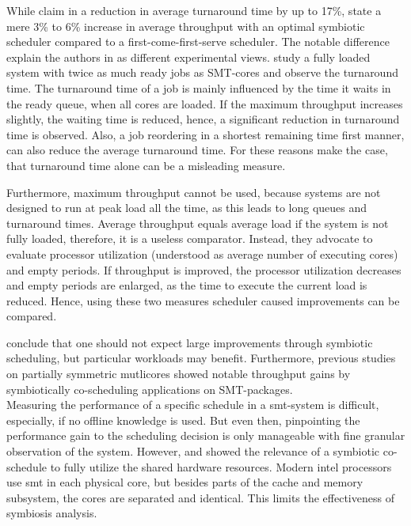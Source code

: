 While \citeauthor{snavely_symbiotic_2000} claim in
\cite{snavely_symbiotic_2000} a reduction in average turnaround time by up to
17\%, \citeauthor{eyerman_revisiting_2015} state a mere 3\% to 6\% increase in
average throughput with an optimal symbiotic scheduler compared to a
first-come-first-serve scheduler.
The notable difference explain the authors in \cite{eyerman_revisiting_2015} as
different experimental views. \citeauthor{snavely_symbiotic_2000} study a fully
loaded system with twice as much ready jobs as SMT-cores and observe the
turnaround time.
The turnaround time of a job is mainly influenced by the time it waits in the
ready queue, when all cores are loaded.
If the maximum throughput increases slightly, the waiting time is reduced,
hence, a significant reduction in turnaround time is observed.
Also, a job reordering in a shortest remaining time first manner, can also
reduce the average turnaround time.
For these reasons \citeauthor{eyerman_revisiting_2015} make the case,
that turnaround time alone can be a misleading measure.

Furthermore, maximum throughput cannot be used, because systems are not
designed to run at peak load all the time, as this leads to long queues and
turnaround times.
Average throughput equals average load if the system is not fully loaded,
therefore, it is a useless comparator.
Instead, they advocate to evaluate processor utilization (understood as average
number of executing cores) and empty periods.
If throughput is improved, the processor utilization decreases and empty
periods are enlarged, as the time to execute the current load is reduced.
Hence, using these two measures scheduler caused improvements can be compared.

\citeauthor{eyerman_revisiting_2015} conclude that one should not expect large
improvements through symbiotic scheduling, but particular workloads may benefit.
Furthermore, previous studies on partially symmetric mutlicores showed
notable throughput gains by symbiotically co-scheduling applications on
SMT-packages.
\\

Measuring the performance of a specific schedule in a \gls{smt}-system is
difficult, especially, if no offline knowledge is used.
But even then, pinpointing the performance gain to the scheduling decision is
only manageable with fine granular observation of the system.
However, \cite{snavely_symbiotic_2000} and \cite{eyerman_revisiting_2015}
showed the relevance of a symbiotic co-schedule to fully utilize the shared
hardware resources.
Modern \gls{intel} processors use \gls{smt} in each physical core, but besides
parts of the cache and memory subsystem, the cores are separated and
identical.
This limits the effectiveness of symbiosis analysis.
\\

